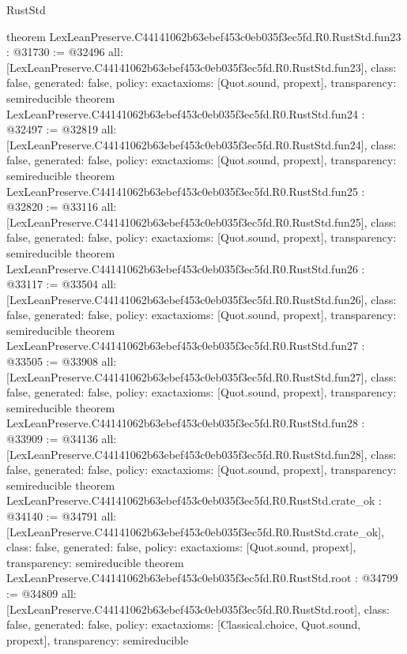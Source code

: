\begin{lexlean}{RustStd}
\begin{coremodule}
{}
theorem LexLeanPreserve.C44141062b63ebef453c0eb035f3ec5fd.R0.RustStd.fun23 : @31730 := @32496 {
  all: [LexLeanPreserve.C44141062b63ebef453c0eb035f3ec5fd.R0.RustStd.fun23],
  class: false,
  generated: false,
  policy: exact{axioms: [Quot.sound, propext]},
  transparency: semireducible
}
theorem LexLeanPreserve.C44141062b63ebef453c0eb035f3ec5fd.R0.RustStd.fun24 : @32497 := @32819 {
  all: [LexLeanPreserve.C44141062b63ebef453c0eb035f3ec5fd.R0.RustStd.fun24],
  class: false,
  generated: false,
  policy: exact{axioms: [Quot.sound, propext]},
  transparency: semireducible
}
theorem LexLeanPreserve.C44141062b63ebef453c0eb035f3ec5fd.R0.RustStd.fun25 : @32820 := @33116 {
  all: [LexLeanPreserve.C44141062b63ebef453c0eb035f3ec5fd.R0.RustStd.fun25],
  class: false,
  generated: false,
  policy: exact{axioms: [Quot.sound, propext]},
  transparency: semireducible
}
theorem LexLeanPreserve.C44141062b63ebef453c0eb035f3ec5fd.R0.RustStd.fun26 : @33117 := @33504 {
  all: [LexLeanPreserve.C44141062b63ebef453c0eb035f3ec5fd.R0.RustStd.fun26],
  class: false,
  generated: false,
  policy: exact{axioms: [Quot.sound, propext]},
  transparency: semireducible
}
theorem LexLeanPreserve.C44141062b63ebef453c0eb035f3ec5fd.R0.RustStd.fun27 : @33505 := @33908 {
  all: [LexLeanPreserve.C44141062b63ebef453c0eb035f3ec5fd.R0.RustStd.fun27],
  class: false,
  generated: false,
  policy: exact{axioms: [Quot.sound, propext]},
  transparency: semireducible
}
theorem LexLeanPreserve.C44141062b63ebef453c0eb035f3ec5fd.R0.RustStd.fun28 : @33909 := @34136 {
  all: [LexLeanPreserve.C44141062b63ebef453c0eb035f3ec5fd.R0.RustStd.fun28],
  class: false,
  generated: false,
  policy: exact{axioms: [Quot.sound, propext]},
  transparency: semireducible
}
theorem LexLeanPreserve.C44141062b63ebef453c0eb035f3ec5fd.R0.RustStd.crate_ok : @34140 := @34791 {
  all: [LexLeanPreserve.C44141062b63ebef453c0eb035f3ec5fd.R0.RustStd.crate_ok],
  class: false,
  generated: false,
  policy: exact{axioms: [Quot.sound, propext]},
  transparency: semireducible
}
theorem LexLeanPreserve.C44141062b63ebef453c0eb035f3ec5fd.R0.RustStd.root : @34799 := @34809 {
  all: [LexLeanPreserve.C44141062b63ebef453c0eb035f3ec5fd.R0.RustStd.root],
  class: false,
  generated: false,
  policy: exact{axioms: [Classical.choice, Quot.sound, propext]},
  transparency: semireducible
}


\end{coremodule}
\end{lexlean}
